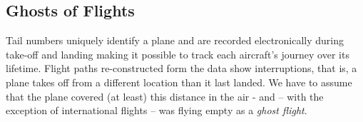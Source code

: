 \documentclass[11pt]{article}
\begin{document}
\subsection{Ghosts of Flights}
%
Tail numbers uniquely identify a plane and are recorded electronically during take-off and landing making it possible to track each aircraft's journey over its lifetime. Flight paths re-constructed form the data show interruptions, that is, a plane takes off from a different location than it last landed. We have to assume that the plane covered  (at least) this distance in the air - and -- with the exception of international flights -- was flying empty as a {\it ghost flight}.
\end{document}
